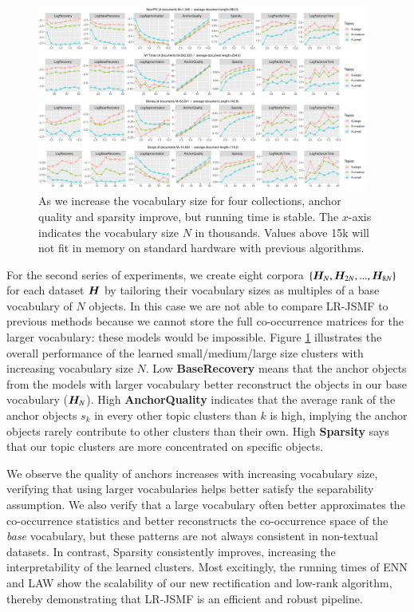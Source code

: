 \begin{figure}[ht]
 	\centering
	\includegraphics[width=0.97\textwidth, trim={1.0cm 1.0cm 1.0cm 0.0cm}]
	{./lrtm/pics/real_TopicsPerVocabs_new-plain.pdf}
	\caption{As we increase the vocabulary size for four collections, anchor
	quality and sparsity improve, but running time is stable. The $x$-axis
	indicates the vocabulary size $N$ in thousands. Values above 15k will not fit
	in memory on standard hardware with previous algorithms.}
	\label{fig:results-vocabs}
\end{figure}

For the second series of experiments, 
we create eight corpora $\{\bm{H}_N, \bm{H}_{2N}, ..., \bm{H}_{8N}\}$ for each dataset
$\bm{H}$ by tailoring their vocabulary sizes as multiples of a base vocabulary of
$N$ objects. In this case we are not able to compare LR-JSMF to previous methods
because we cannot store the full co\hyp{}occurrence matrices for the larger
vocabulary: these models would be impossible. Figure \ref{fig:results-vocabs}
illustrates the overall performance of the learned small/medium/large size
clusters with increasing vocabulary size $N$. Low \textbf{BaseRecovery} means
that the anchor objects from the models with larger vocabulary better
reconstruct the objects in our base vocabulary ($\bm{H}_N$). High  
\textbf{AnchorQuality} indicates that the average rank of the anchor objects
$s_k$ in every other topic clusters than $k$ is high, implying the anchor
objects rarely contribute to other clusters than their own. High 
\textbf{Sparsity}  \cite{Hoyer2004} says that our topic clusters are more concentrated on specific objects.

We observe the quality of anchors increases with increasing vocabulary size,
verifying that using larger vocabularies helps better satisfy the separability
assumption. We also verify that a large vocabulary often better approximates the
co\hyp{}occurrence statistics and better reconstructs the co\hyp{}occurrence
space of the \textit{base} vocabulary, but these patterns are not always
consistent in non-textual datasets. In contrast, Sparsity consistently improves,
increasing the interpretability of the learned clusters. Most excitingly, the
running times of ENN and LAW show the scalability of our new rectification and
low-rank algorithm, thereby demonstrating that LR-JSMF is an efficient and
robust pipeline.

